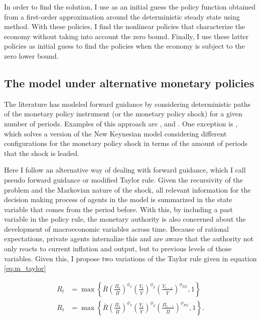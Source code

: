 \documentclass[12pt]{article}
\numberwithin{equation}{section}
\begin{document}
In order to find the solution, I use as an initial guess the policy function obtained from a first-order approximation around the deterministic steady state using \cite{Sims2002} method. With these policies, I find the nonlinear policies that characterize the economy without taking into account the zero bound. Finally, I use these latter policies as initial guess to find the policies when the economy is subject to the zero lower bound.

\subsection{The model under alternative monetary policies}

The literature has modeled forward guidance by considering deterministic paths of the monetary policy instrument (or the monetary policy shock) for a given number of periods. Examples of this approach are \cite{DelNegroEtAl2015}, \cite{KaplanEtAl2016} and \cite{McKayEtAl2016}. One exception is \cite{KeenEtAl2016}, which solves a version of the New Keynesian model considering different configurations for the monetary policy shock in terms of the amount of periods that the shock is leaded.

Here I follow an alternative way of dealing with forward guidance, which I call pseudo forward guidance or modified Taylor rule. Given the recursivity of the problem and the Markovian nature of the shock, all relevant information for the decision making process of agents in the model is summarized in the state variable that comes from the period before. With this, by including a past variable in the policy rule, the monetary authority is also concerned about the development of macroeconomic variables across time. Because of rational expectations, private agents internalize this and are aware that the authority not only reacts to current inflation and output, but to previous levels of those variables. Given this, I propose two variations of the Taylor rule given in equation \eqref{eq:m_taylor}

\begin{align}
	R_t&=\max\left\{\overline R\left(\frac{\Pi_t}{\overline\Pi}\right)^{\phi_{\pi}}\left(\frac{Y_t}{\overline{Y}}\right)^{\phi_{y}}\left(\frac{Y_{t-1}}{\overline{Y}}\right)^{\phi_{FG}},1\right\}\label{eq:m_taylor_fg1}\\
	R_t&=\max\left\{\overline R\left(\frac{\Pi_t}{\overline\Pi}\right)^{\phi_{\pi}}\left(\frac{Y_t}{\overline{Y}}\right)^{\phi_{y}}\left(\frac{\Pi_{t-1}}{\overline\Pi}\right)^{\phi_{FG}},1\right\}\label{eq:m_taylor_fg2}.
\end{align}
\end{document}
